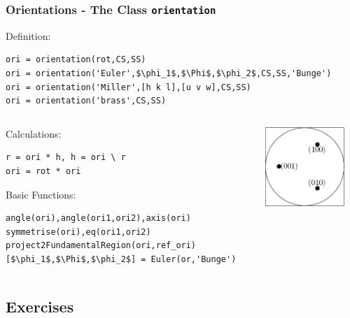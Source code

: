 \begin{frame}[fragile]
  \frametitle{Orientations - The \MTEX Class \texttt{\bf orientation}}

Definition:

\begin{lstlisting}[mathescape=true]
ori = orientation(rot,CS,SS)
ori = orientation('Euler',$\phi_1$,$\Phi$,$\phi_2$,CS,SS,'Bunge')
ori = orientation('Miller',[h k l],[u v w],CS,SS)
ori = orientation('brass',CS,SS)
\end{lstlisting}

\begin{columns}
  \begin{column}{8.5cm}

    Calculations:

\begin{lstlisting}
r = ori * h, h = ori \ r
ori = rot * ori
\end{lstlisting}

    Basic Functions:

\begin{lstlisting}[mathescape=true]
angle(ori),angle(ori1,ori2),axis(ori)
symmetrise(ori),eq(ori1,ori2)
project2FundamentalRegion(ori,ref_ori)
[$\phi_1$,$\Phi$,$\phi_2$] = Euler(or,'Bunge')
\end{lstlisting}

  \end{column}

  \begin{column}{3cm}
    \includegraphics[width=3cm]{pic/quaternion}
  \end{column}

\end{columns}
\end{frame}



\subsection*{Exercises}

